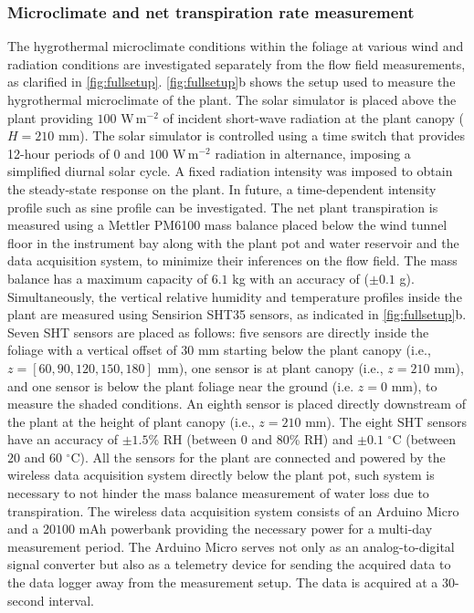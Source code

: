 \subsubsection*{Microclimate and net transpiration rate measurement}
The hygrothermal microclimate conditions within the foliage at various wind and radiation conditions are investigated separately from the flow field measurements, as clarified in \cref{fig:fullsetup}. \cref{fig:fullsetup}b shows the setup used to measure the hygrothermal microclimate of the plant. The solar simulator is placed above the plant providing $100$ W\,m$^{-2}$ of incident short-wave radiation at the plant canopy ($H=210$ mm). The solar simulator is controlled using a time switch that provides 12-hour periods of $0$ and $100$ W\,m$^{-2}$ radiation in alternance, imposing a simplified diurnal solar cycle. A fixed radiation intensity was imposed to obtain the steady-state response on the plant. In future, a time-dependent intensity profile such as sine profile can be investigated. The net plant transpiration is measured using a Mettler PM6100 mass balance placed below the wind tunnel floor in the instrument bay along with the plant pot and water reservoir and the data acquisition system, to minimize their inferences on the flow field. The mass balance has a maximum capacity of $6.1$ kg with an accuracy of ($\pm 0.1$ g). Simultaneously, the vertical relative humidity and temperature profiles inside the plant are measured using Sensirion SHT35 sensors, as indicated in \cref{fig:fullsetup}b. Seven SHT sensors are placed as follows: five sensors are directly inside the foliage with a vertical offset of $30$ mm starting below the plant canopy (i.e., $z=[60,90,120,150,180]$ mm), one sensor is at plant canopy (i.e., $z=210$ mm), and one sensor is below the plant foliage near the ground (i.e. $z=0$ mm), to measure the shaded conditions. An eighth sensor is placed directly downstream of the plant at the height of plant canopy (i.e., $z=210$ mm). The eight SHT sensors have an accuracy of $\pm1.5$\% RH (between $0$ and $80$\% RH) and $\pm0.1$ $^{\circ}$C (between $20$ and $60$ $^{\circ}$C). All the sensors for the plant are connected and powered by the wireless data acquisition system directly below the plant pot, such system is necessary to not hinder the mass balance measurement of water loss due to transpiration. The wireless data acquisition system consists of an Arduino Micro and a $\num{20100}$ mAh powerbank providing the necessary power for a multi-day measurement period. The Arduino Micro serves not only as an analog-to-digital signal converter but also as a telemetry device for sending the acquired data to the data logger away from the measurement setup. The data is acquired at a 30-second interval. 


